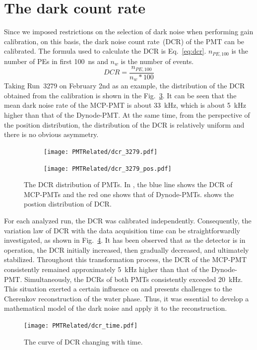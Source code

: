 \section{The dark count rate}
\label{sec:dcr}
Since we imposed restrictions on the selection of dark noise when performing gain calibration, on this basis, the dark noise count rate~(DCR) of the PMT can be calibrated. The formula used to calculate the DCR is Eq.~\eqref{eq:dcr}. $n_{PE,100}$ is the number of PEs in first \SI{100}{ns} and $n_w$ is the number of events.
\begin{equation}
	DCR=\frac{n_{PE,100}}{n_w*100}
	\label{eq:dcr}
\end{equation}
Taking Run~3279 on February 2nd as an example, the distribution of the DCR obtained from the calibration is shown in the Fig.~\ref{fig:dcr_calib}. It can be seen that the mean dark noise rate of the MCP-PMT is about \SI{33}{kHz}, which is about \SI{5}{kHz} higher than that of the Dynode-PMT. At the same time, from the perspective of the position distribution, the distribution of the DCR is relatively uniform and there is no obvious asymmetry.
\begin{figure}[h]
	\centering
	\begin{subfigure}{0.6\textwidth}
		\centering
		\texttt{[image: PMTRelated/dcr\_3279.pdf]}
		\caption{}
		\label{fig:dcr}
	\end{subfigure}%
	\hfill
	\begin{subfigure}{\textwidth}
		\centering
		\texttt{[image: PMTRelated/dcr\_3279\_pos.pdf]}
		\caption{}
		\label{fig:dcrpos}
	\end{subfigure}
	\caption{The DCR distribution of PMTs. In , the blue line shows the DCR of MCP-PMTs and the red one shows that of Dynode-PMTs.  shows the postion distribution of DCR.}
	\label{fig:dcr_calib}
\end{figure}
For each analyzed run, the DCR was calibrated independently. Consequently, the variation law of DCR with the data acquisition time can be straightforwardly investigated, as shown in Fig.~\ref{fig:dcr_time}. It has been observed that as the detector is in operation, the DCR initially increased, then gradually decreased, and ultimately stabilized. Throughout this transformation process, the DCR of the MCP-PMT consistently remained approximately \SI{5}{kHz} higher than that of the Dynode-PMT. Simultaneously, the DCRs of both PMTs consistently exceeded \SI{20}{kHz}. This situation exerted a certain influence on and presents challenges to the Cherenkov reconstruction of the water phase. Thus, it was essential to develop a mathematical model of the dark noise and apply it to the reconstruction.
\begin{figure}[h]
	\centering
	\texttt{[image: PMTRelated/dcr\_time.pdf]}
	\caption{The curve of DCR changing with time.}
	\label{fig:dcr_time}
\end{figure}

